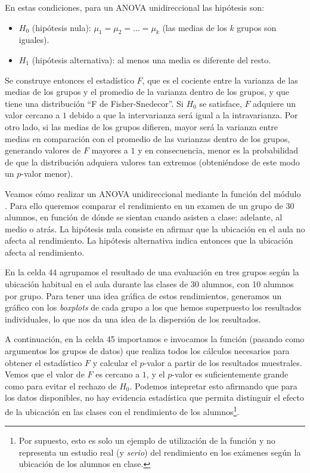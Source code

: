 En estas condiciones, para un ANOVA unidireccional las hipótesis son:
\begin{itemize}
 \item $H_0$ (hipótesis nula): $\mu_1 = \mu_2 = \ldots = \mu_k$ (las medias de los $k$ grupos son iguales).
 \item $H_1$ (hipótesis alternativa): al menos una media es diferente del resto.
\end{itemize}

Se construye entonces el estadístico $F$, que es el cociente entre la varianza de las medias de los grupos y el promedio de la varianza dentro de los grupos, y que tiene una distribución ``F de Fisher-Snedecor''. Si $H_0$ se satisface, $F$ adquiere un valor cercano a $1$ debido a que la intervarianza será igual a la intravarianza. Por otro lado, si las medias de los grupos difieren, mayor será la varianza entre medias en comparación con el promedio de las varianzas dentro de los grupos, generando valores de $F$ mayores a $1$ y en consecuencia, menor es la probabilidad de que la distribución adquiera valores tan extremos (obteniéndose de este modo un $p$-valor menor).

Veamos cómo realizar un ANOVA unidireccional mediante la función  del módulo . Para ello queremos comparar el rendimiento en un examen de un grupo de 30 alumnos, en función de dónde se sientan cuando asisten a clase: adelante, al medio o atrás. La hipótesis nula consiste en afirmar que la ubicación en el aula no afecta al rendimiento. La hipótesis alternativa indica entonces que la ubicación afecta al rendimiento.

En la celda 44 agrupamos el resultado de una evaluación en tres grupos según la ubicación habitual en el aula durante las clases de 30 alumnos, con 10 alumnos por grupo. Para tener una idea gráfica de estos rendimientos, generamos un gráfico con los \textit{boxplots} de cada grupo a los que hemos superpuesto los resultados individuales, lo que nos da una idea de la dispersión de los resultados.

A continuación, en la celda 45 importamos e invocamos la función  (pasando como argumentos los grupos de datos) que realiza todos los cálculos necesarios para obtener el estadístico $F$ y calcular el $p$-valor a partir de los resultados muestrales. Vemos que el valor de $F$ es cercano a $1$, y el $p$-valor es suficientemente grande como para evitar el rechazo de $H_0$. Podemos intepretar esto afirmando que para los datos disponibles, no hay evidencia estadística que permita distinguir el efecto de la ubicación en las clases con el rendimiento de los alumnos\footnote{Por supuesto, esto es solo un ejemplo de utilización de la función  y no representa un estudio real (y \textit{serio}) del rendimiento en los exámenes según la ubicación de los alumnos en clase.}.

